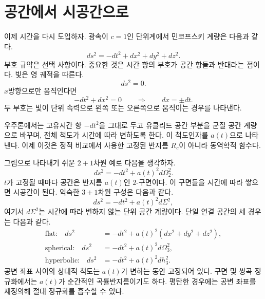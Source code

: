 \section{공간에서 시공간으로}

이제 시간을 다시 도입하자. 광속이 \(c=1\)인 단위계에서 민코프스키 계량은 다음과 같다.
\begin{equation}
ds^2 = -dt^2 + dx^2 + dy^2 + dz^2.
\label{eq:c03-minkowski}
\end{equation}
부호 규약은 선택 사항이다. 중요한 것은 시간 항의 부호가 공간 항들과 반대라는 점이다. 빛은 영 궤적을 따른다.
\begin{equation}
ds^2 = 0.
\end{equation}
\(x\)방향으로만 움직인다면
\begin{equation}
-dt^2 + dx^2 = 0
\qquad\Rightarrow\qquad
dx = \pm dt.
\label{eq:c03-null-flat}
\end{equation}
두 부호는 빛이 단위 속력으로 왼쪽 또는 오른쪽으로 움직이는 경우를 나타낸다.

우주론에서는 고유시간 항 \(-dt^2\)을 그대로 두고 유클리드 공간 부분을 균질 공간 계량으로 바꾸며, 전체 척도가 시간에 따라 변하도록 한다. 이 척도인자를 \(a(t)\)으로 나타낸다. 이제 이것은 정적 비교에서 사용한 고정된 반지름 \(R_c\)이 아니라 동역학적 함수다.

그림으로 나타내기 쉬운 \(2+1\)차원 예로 다음을 생각하자.
\begin{equation}
ds^2 = -dt^2 + a(t)^2 d\Omega_2^2.
\label{eq:c03-two-plus-one}
\end{equation}
\(t\)가 고정될 때마다 공간은 반지름 \(a(t)\)인 \(2\)-구면이다. 이 구면들을 시간에 따라 쌓으면 시공간이 된다. 익숙한 \(3+1\)차원 구성은 다음과 같다.
\begin{equation}
ds^2 = -dt^2 + a(t)^2 d\Sigma^2,
\label{eq:c03-frw-general}
\end{equation}
여기서 \(d\Sigma^2\)는 시간에 따라 변하지 않는 단위 공간 계량이다. 단일 연결 공간의 세 경우는 다음과 같다.
\begin{align}
\text{flat:}\quad
ds^2&=-dt^2+a(t)^2\left(dx^2+dy^2+dz^2\right),\label{eq:c03-frw-flat}\\
\text{spherical:}\quad
ds^2&=-dt^2+a(t)^2d\Omega_3^2,\label{eq:c03-frw-spherical}\\
\text{hyperbolic:}\quad
ds^2&=-dt^2+a(t)^2dh_3^2.\label{eq:c03-frw-hyperbolic}
\end{align}
공변 좌표 사이의 상대적 척도는 \(a(t)\)가 변하는 동안 고정되어 있다. 구면 및 쌍곡 정규화에서는 \(a(t)\)가 순간적인 곡률반지름이기도 하다. 평탄한 경우에는 공변 좌표를 재정의해 절대 정규화를 흡수할 수 있다.

